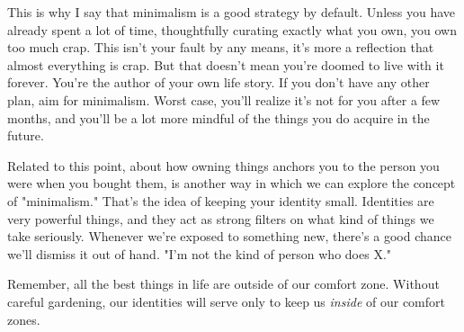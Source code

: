 \documentclass[../the-millions-of-gestures.tex]{subfiles}
\begin{document}
This is why I say that minimalism is a good strategy by default. Unless you have
already spent a lot of time, thoughtfully curating exactly what you own, you own
too much crap. This isn't your fault by any means, it's more a reflection that
almost everything is crap. But that doesn't mean you're doomed to live with it
forever. You're the author of your own life story. If you don't have any other
plan, aim for minimalism. Worst case, you'll realize it's not for you after a
few months, and you'll be a lot more mindful of the things you do acquire in the
future.

Related to this point, about how owning things anchors you to the person you
were when you bought them, is another way in which we can explore the concept of
"minimalism." That's the idea of keeping your identity small. Identities are
very powerful things, and they act as strong filters on what kind of things we
take seriously. Whenever we're exposed to something new, there's a good chance
we'll dismiss it out of hand. "I'm not the kind of person who does X."

Remember, all the best things in life are outside of our comfort zone. Without
careful gardening, our identities will serve only to keep us \emph{inside} of
our comfort zones.
\end{document}
